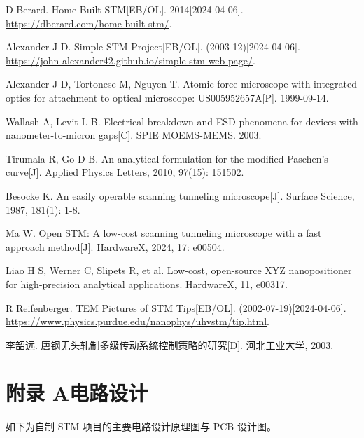 \documentclass{article}
\begin{document}
\begin{thebibliography}{25}
	 D Berard. Home-Built STM[EB/OL]. 2014[2024-04-06]. \href{https://dberard.com/home-built-stm/}{https://dberard.com/home-built-stm/}.
	
	 Alexander J D. Simple STM Project[EB/OL]. (2003-12)[2024-04-06]. \href{https://john-alexander42.github.io/simple-stm-web-page/}{https://john-alexander42.github.io/simple-stm-web-page/}.
	
	 Alexander J D, Tortonese M, Nguyen T. Atomic force microscope with integrated optics for attachment to optical microscope: US005952657A[P]. 1999-09-14.
	
	 Wallash A, Levit L B. Electrical breakdown and ESD phenomena for devices with nanometer-to-micron gaps[C]. SPIE MOEMS-MEMS. 2003. 
	
	 Tirumala R, Go D B. An analytical formulation for the modified Paschen’s curve[J]. Applied Physics Letters, 2010, 97(15): 151502.
	
	 Besocke K. An easily operable scanning tunneling microscope[J]. Surface Science, 1987, 181(1): 1-8.
	
	 Ma W. Open STM: A low-cost scanning tunneling microscope with a fast approach method[J]. HardwareX, 2024, 17: e00504.
	
	 Liao H S, Werner C, Slipets R, et al. Low-cost, open-source XYZ nanopositioner for high-precision analytical applications. HardwareX, 11, e00317.
	
	 R Reifenberger. TEM Pictures of STM Tips[EB/OL]. (2002-07-19)[2024-04-06]. \href{https://www.physics.purdue.edu/nanophys/uhvstm/tip.html}{https://www.physics.purdue.edu/nanophys/uhvstm/tip.html}.
	
	 李韶远. 唐钢无头轧制多级传动系统控制策略的研究[D]. 河北工业大学, 2003.
	
	
\end{thebibliography}
\endgroup

\newpage
\appendix
\section*{附录 A\quad 电路设计}
{} %
\label{app:A}

如下为自制 STM 项目的主要电路设计原理图与 PCB 设计图。
\end{document}
